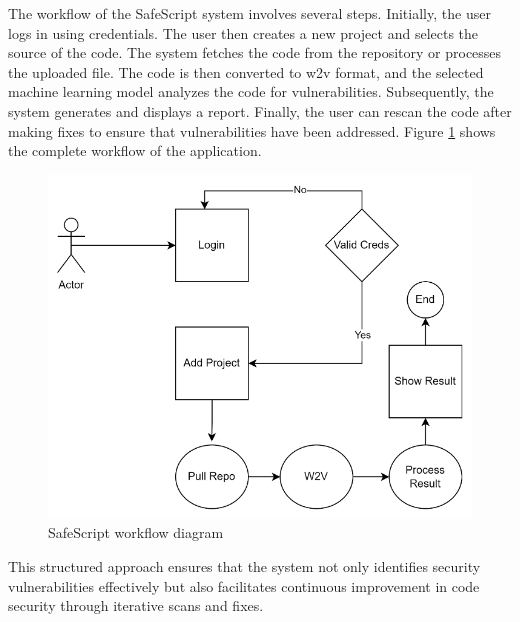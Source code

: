 The workflow of the SafeScript system involves several steps. Initially, the user logs in using credentials. 
The user then creates a new project and selects the source of the code. 
The system fetches the code from the repository or processes the uploaded file. 
The code is then converted to w2v format, and the selected machine learning model analyzes the code for vulnerabilities. 
Subsequently, the system generates and displays a report. Finally, the user can rescan the code after making fixes to ensure that vulnerabilities 
have been addressed.
Figure \ref{fig:workflow} shows the complete workflow of the application.

\begin{figure}[H]
    \centering
    \includegraphics[width=0.9\linewidth]{images/workflow.png}
    \caption{SafeScript workflow diagram}
    \label{fig:workflow}
\end{figure}

This structured approach ensures that the system not only identifies security vulnerabilities effectively but also facilitates continuous improvement 
in code security through iterative scans and fixes.